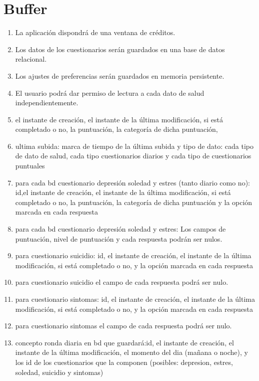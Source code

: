 \section{Buffer}
    \begin{enumerate}
        \item La aplicación dispondrá de una ventana de créditos.
        
        \item Los datos de los cuestionarios serán guardados en una base de datos relacional.
        \item Los ajustes de preferencias serán guardados en memoria persistente.
    	
        \item El usuario podrá dar permiso de lectura a cada dato de salud independientemente.
    
        \item el instante de creación, el instante de la última modificación, si está completado o no, la puntuación, la categoría de dicha puntuación, 
        \item ultima subida: marca de tiempo de la última subida y tipo de dato: cada tipo de dato de salud, cada tipo cuestionarios diarios y cada tipo de cuestionarios puntuales
        \item para cada bd cuestionario depresión soledad y estres (tanto diario como no): id,el instante de creación, el instante de la última modificación, si está completado o no, la puntuación, la categoría de dicha puntuación y la opción marcada en cada respuesta
        \item para cada bd cuestionario depresión soledad y estres: Los campos de puntuación, nivel de puntuación y cada respuesta podrán ser nulos.
    
        \item para cuestionario suicidio: id, el instante de creación, el instante de la última modificación, si está completado o no, y la opción marcada en cada respuesta
        \item para cuestionario suicidio el campo de cada respuesta podrá ser nulo.
    
        \item para cuestionario sintomas: id, el instante de creación, el instante de la última modificación, si está completado o no, y la opción marcada en cada respuesta
        \item para cuestionario sintomas el campo de cada respuesta podrá ser nulo.
    
        \item concepto ronda diaria en bd que guardará:id, el instante de creación, el instante de la última modificación, el momento del dia (mañana o noche), y los id de los cuestionarios que la componen (posibles: depresion, estres, soledad, suicidio y sintomas)
    

\end{enumerate}
